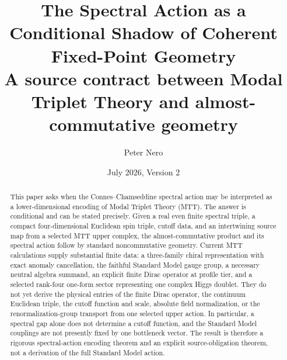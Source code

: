 \documentclass[11pt]{article}
\title{\textbf{The Spectral Action as a Conditional Shadow of Coherent Fixed-Point Geometry}\\
\large A source contract between Modal Triplet Theory and almost-commutative geometry}
\author{Peter Nero}
\date{July 2026, Version 2}
\begin{document}
\maketitle

\begin{abstract}
This paper asks when the Connes--Chamseddine spectral action may be interpreted
as a lower-dimensional encoding of Modal Triplet Theory (MTT).  The answer is
conditional and can be stated precisely.  Given a real even finite spectral
triple, a compact four-dimensional Euclidean spin triple, cutoff data, and an
intertwining source map from a selected MTT upper complex, the
almost-commutative product and its spectral action follow by standard
noncommutative geometry.  Current MTT calculations supply substantial finite
data: a three-family chiral representation with exact anomaly cancellation, the
faithful Standard Model gauge group, a necessary neutral algebra summand, an
explicit finite Dirac operator at profile tier, and a selected rank-four
one-form sector representing one complex Higgs doublet.  They do not yet derive
the physical entries of the finite Dirac operator, the continuum Euclidean
triple, the cutoff function and scale, absolute field normalization, or the
renormalization-group transport from one selected upper action.  In particular,
a spectral gap alone does not determine a cutoff function, and the Standard
Model couplings are not presently fixed by one bottleneck vector.  The result
is therefore a rigorous spectral-action encoding theorem and an explicit
source-obligation theorem, not a derivation of the full Standard Model action.
\end{abstract}
\end{document}
